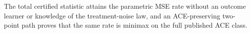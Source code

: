 The total certified statistic attains the parametric MSE rate without an outcome learner or knowledge of the treatment-noise law, and an ACE-preserving two-point path proves that the same rate is minimax on the full published ACE class.